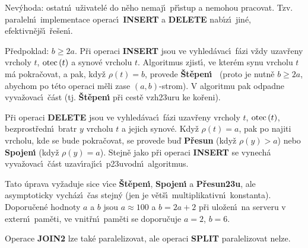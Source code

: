 \flushpar Nev\'yhoda: ostatn\'\i\ u\v zivatel\'e  
do n\v eho nemaj\'\i\ p\v r\'\i stup a nemohou pracovat. Tzv. paraleln\'\i\ 
implementace operac\'\i\ {\bf INSERT} a {\bf DELETE} nab\'\i z\'\i\ jin\'e, 
efektivn\v ej\v s\'\i\ \v re\v sen\'\i .
\medskip

\flushpar P\v redpoklad: $b\ge 2a$. \newline 
P\v ri operaci {\bf INSERT} jsou ve vyhled\'avac\'\i\ f\'azi v\v zdy 
uzav\v reny vrcholy $t$, $\operatorname{otec}\left(t\right)$ a synov\'e vrcholu $t$. 
Algoritmus zjist\'\i , ve kter\'em synu vrcholu $t$ m\'a 
pokra\v covat, a pak, kdy\v z $\rho \left(t\right)=b$, provede {\bf \v St\v epen\'\i\ }
(proto je nutn\v e $b\ge 2a$, abychom po t\'eto ope\-raci m\v eli 
zase $\left(a,b\right)$-strom). V algoritmu pak odpadne vyva\-\v zo\-vac\'\i\ 
\v c\'ast (tj. {\bf \v St\v epen\'\i} p\v ri cest\v e vzh\accent23uru ke 
ko\v reni).
\medskip

\flushpar P\v ri operaci {\bf DELETE} jsou ve vyhled\'avac\'\i\ f\'azi uzav\v reny 
vrcholy $t$, $\operatorname{otec}\left(t\right)$, bezprost\v redn\'\i\ bratr $y$ vrcholu $
t$ a 
jejich synov\'e. 
Kdy\v z $\rho \left(t\right)=a$, pak po najiti vrcholu, kde se bude 
pokra\v covat, se provede bu\v d {\bf P\v resun} (kdy\v z $\rho \left(
y\right)>a$) nebo 
{\bf Spojen\'\i} (kdy\v z $\rho \left(y\right)=a$). Stejn\v e jako p\v ri operaci 
{\bf INSERT} se vynech\'a vyva\-\v zo\-vac\'\i\ \v c\'ast 
uzav\'\i raj\'\i c\'\i\ p\accent23uvodn\'\i\ algoritmus.
\medskip

\flushpar Tato \'uprava vy\v zaduje sice v\'\i ce {\bf \v St\v epen\'\i }, {\bf Spojen\'\i} a
{\bf P\v resun\accent23u}, ale asymptoticky vych\'az\'\i\ \v cas stejn\'y 
(jen je v\v et\v s\'\i\ multiplikativn\'\i\ konstanta). Doporu\v cen\'e 
hodnoty $a$ a $b$ jsou $a\approx 100$ a $b=2a+2$ p\v ri ulo\v zen\'\i\ na serveru 
v extern\'\i\ pam\v eti, ve vnit\v rn\'\i\ pam\v eti 
se doporu\v cuje $a=2$, $b=6$.
\medskip

\flushpar Operace {\bf JOIN2} lze tak\'e paralelizovat, ale operaci {\bf SPLIT  }
paralelizovat nelze.
\medskip

